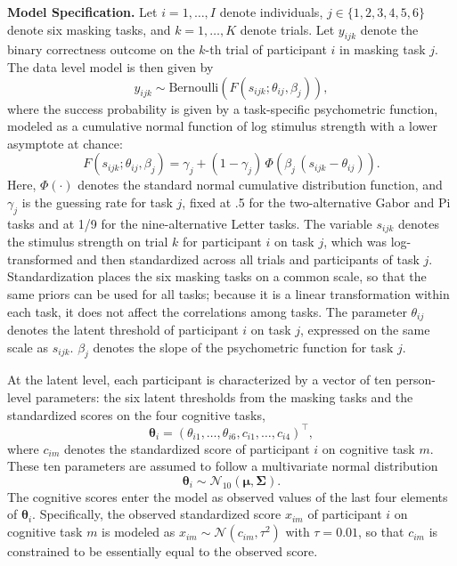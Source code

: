 \documentclass[
  ,man]{apa6}
\begin{document}
\textbf{Model Specification.} Let \(i = 1,\dots,I\) denote individuals, \(j \in \{1,2,3,4,5,6\}\) denote six masking tasks, and \(k = 1,\dots,K\) denote trials. Let \(y_{ijk}\) denote the binary correctness outcome on the \(k\)-th trial of participant \(i\) in masking task \(j\). The data level model is then given by
\[
y_{ijk} \sim \text{Bernoulli}\!\left(F(s_{ijk}; \theta_{ij}, \beta_{j})\right),
\]
where the success probability is given by a task-specific psychometric function, modeled as a cumulative normal function of log stimulus strength with a lower asymptote at chance:
\[
F(s_{ijk}; \theta_{ij}, \beta_{j}) = \gamma_j + (1-\gamma_j)\,\Phi\!\left(\beta_j\,(s_{ijk}-\theta_{ij})\right).
\]
Here, \(\Phi(\cdot)\) denotes the standard normal cumulative distribution function, and \(\gamma_j\) is the guessing rate for task \(j\), fixed at .5 for the two-alternative Gabor and Pi tasks and at 1/9 for the nine-alternative Letter tasks. The variable \(s_{ijk}\) denotes the stimulus strength on trial \(k\) for participant \(i\) on task \(j\), which was log-transformed and then standardized across all trials and participants of task \(j\). Standardization places the six masking tasks on a common scale, so that the same priors can be used for all tasks; because it is a linear transformation within each task, it does not affect the correlations among tasks. The parameter \(\theta_{ij}\) denotes the latent threshold of participant \(i\) on task \(j\), expressed on the same scale as \(s_{ijk}\). \(\beta_j\) denotes the slope of the psychometric function for task \(j\).

At the latent level, each participant is characterized by a vector of ten person-level parameters: the six latent thresholds from the masking tasks and the standardized scores on the four cognitive tasks,
\[
\boldsymbol{\theta}_i = \left(\theta_{i1}, \ldots, \theta_{i6}, c_{i1}, \ldots, c_{i4}\right)^\top,
\]
where \(c_{im}\) denotes the standardized score of participant \(i\) on cognitive task \(m\). These ten parameters are assumed to follow a multivariate normal distribution
\[
\boldsymbol{\theta}_i \sim \mathcal{N}_{10}\!\left(\boldsymbol{\mu}, \boldsymbol{\Sigma}\right).
\]
The cognitive scores enter the model as observed values of the last four elements of \(\boldsymbol{\theta}_i\). Specifically, the observed standardized score \(x_{im}\) of participant \(i\) on cognitive task \(m\) is modeled as
\(x_{im} \sim \mathcal{N}(c_{im}, \tau^2)\) with \(\tau = 0.01\), so that \(c_{im}\) is constrained to be essentially equal to the observed score.
\end{document}
